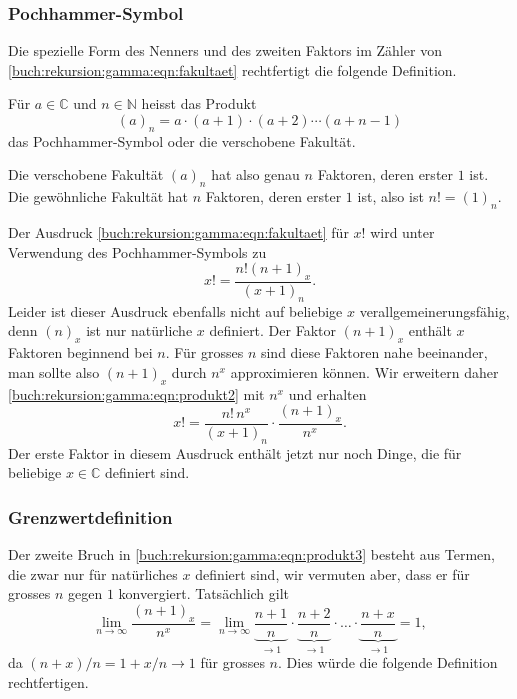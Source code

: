 %
%
\subsubsection{Pochhammer-Symbol}
Die spezielle Form des Nenners und des zweiten Faktors im Zähler
von \eqref{buch:rekursion:gamma:eqn:fakultaet}
rechtfertigt die folgende Definition.

\begin{definition}[Pochhammer]
Für $a\in\mathbb{C}$ und $n\in\mathbb{N}$ heisst das Produkt
\[
(a)_n = a\cdot(a+1)\cdot(a+2)\cdots(a+n-1)
\]
das Pochhammer-Symbol oder die verschobene Fakultät.
\end{definition}

Die verschobene Fakultät $(a)_n$ hat also genau $n$ Faktoren, deren
erster $1$ ist.
Die gewöhnliche Fakultät hat $n$ Faktoren, deren erster $1$ ist, also
ist $n! = (1)_n$.

Der Ausdruck \eqref{buch:rekursion:gamma:eqn:fakultaet}
für $x!$ wird unter Verwendung des Pochhammer-Symbols zu
\begin{equation}
x! = \frac{n! (n+1)_x}{(x+1)_n}.
\label{buch:rekursion:gamma:eqn:produkt2}
\end{equation}
Leider ist dieser Ausdruck ebenfalls nicht auf beliebige $x$
verallgemeinerungsfähig, denn $(n)_x$ ist nur natürliche $x$ definiert.
Der Faktor $(n+1)_x$ enthält $x$ Faktoren beginnend bei $n$.
Für grosses $n$ sind diese Faktoren nahe beeinander, man sollte also
$(n+1)_x$ durch $n^x$ approximieren können.
Wir erweitern daher \eqref{buch:rekursion:gamma:eqn:produkt2} mit $n^x$
und erhalten
\begin{equation}
x!
=
\frac{n!\,n^x}{(x+1)_n}\cdot
\frac{(n+1)_x}{n^x}.
\label{buch:rekursion:gamma:eqn:produkt3}
\end{equation}
Der erste Faktor in diesem Ausdruck enthält jetzt nur noch Dinge,
die für beliebige $x\in\mathbb{C}$ definiert sind.

%
%
\subsubsection{Grenzwertdefinition}
Der zweite Bruch in \eqref{buch:rekursion:gamma:eqn:produkt3}
besteht aus Termen, die zwar nur für natürliches $x$ definiert sind,
wir vermuten aber, dass er für grosses $n$ gegen $1$ konvergiert.
Tatsächlich gilt
\[
\lim_{n\to\infty}
\frac{(n+1)_x}{n^x}
=
\lim_{n\to\infty}
\underbrace{\frac{n+1}{n}}_{\displaystyle\to 1}
\cdot
\underbrace{\frac{n+2}{n}}_{\displaystyle\to 1}
\cdot\ldots\cdot
\underbrace{\frac{n+x}{n}}_{\displaystyle\to 1}
=
1,
\]
da  $(n+x)/n=1+x/n\to 1$ für grosses $n$.
Dies würde die folgende Definition rechtfertigen.

